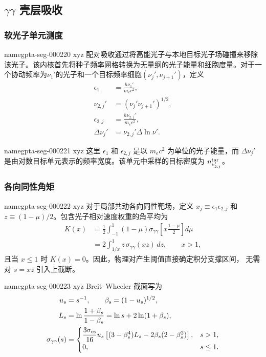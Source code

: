 \documentclass[twocolumn]{aastex702}
\makeatletter
\providecommand{\gptareaderanchor}[1]{\pdfdest name{#1} xyz}%
\providecommand{\gptareaderanchor}[1]{\special{pdf:dest (#1) [ @thispage /XYZ @xpos @ypos null ]}}%
\makeatother
\begin{document}
\subsection{\texorpdfstring{\(\gamma\gamma\)}{gamma-gamma} 壳层吸收}

\subsubsection{软光子单元测度}


\gptareaderanchor{gpta-seg-000220}%
配对吸收通过将高能光子与本地目标光子场碰撞来移除该光子。该内核首先将种子频率网格转换为无量纲的光子能量和细胞度量。对于一个协动频率为\(\nu_1'\)的光子和一个目标频率细胞\((\nu_j',\nu_{j+1}')\)，定义
\begin{equation}
\begin{aligned}
\epsilon_1&=\frac{h\nu_1'}{m_ec^2},\\
\nu_{2,j}'&=(\nu_j'\nu_{j+1}')^{1/2},\\
\epsilon_{2,j}&=\frac{h\nu_{2,j}'}{m_ec^2},\\
\Delta\nu_j'&=\nu_{2,j}'\Delta\ln\nu' .
\end{aligned}
\end{equation}

\gptareaderanchor{gpta-seg-000221}%
这里 \(\epsilon_1\) 和 \(\epsilon_{2,j}\) 是以 \(m_ec^2\) 为单位的光子能量，而 \(\Delta\nu_j'\) 是由对数目标单元表示的频率宽度。该单元中采样的目标密度为 \(n_{\nu_{2,j}'}^{\rm tar}\)。

\subsubsection{各向同性角矩}


\gptareaderanchor{gpta-seg-000222}%
对于局部共动各向同性靶场，定义
\(x_j\equiv\epsilon_1\epsilon_{2,j}\) 和
\(z\equiv(1-\mu)/2\)。包含光子相对速度权重的角平均为
\begin{equation}
\begin{aligned}
K(x)&=\frac{1}{2}\int_{-1}^{1}(1-\mu)
\sigma_{\gamma\gamma}\!\left[x\frac{1-\mu}{2}\right]d\mu\\
&=2\int_{1/x}^{1}z\,\sigma_{\gamma\gamma}(xz)\,dz,
\qquad x>1,
\end{aligned}
\end{equation}
且当 \(x\le1\) 时 \(K(x)=0\)。因此，物理对产生阈值直接确定积分支撑区间，
无需对 \(s=xz\) 引入上截断。

\gptareaderanchor{gpta-seg-000223}%
Breit--Wheeler 截面写为
\begin{equation}
\begin{aligned}
u_s&=s^{-1},\qquad \beta_s=(1-u_s)^{1/2},\\
L_s&=\ln\frac{1+\beta_s}{1-\beta_s}
=\ln s+2\ln(1+\beta_s),\\
\sigma_{\gamma\gamma}(s)&=
\begin{cases}
\dfrac{3\sigma_{\rm es}}{16}u_s
\left[(3-\beta_s^4)L_s-2\beta_s(2-\beta_s^2)\right], & s>1,\\
0, & s\le1 .
\end{cases}
\end{aligned}
\end{equation}
\end{document}
